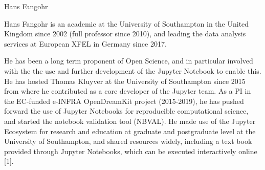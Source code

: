 \begin{participant}[type=leadPI,PM=4,gender=male]{Hans Fangohr}








  \medskip Hans Fangohr is an academic at the University
  of Southampton in the United Kingdom since 2002 (full professor
  since 2010), and leading the data analysis services at European XFEL
  in Germany since 2017.

  He has been a long term proponent of Open Science, and in particular
  involved with the the use and further development of the Jupyter
  Notebook to enable this. He has hosted Thomas Kluyver at the
  University of Southampton since 2015 from where he contributed as a
  core developer of the Jupyter team. As a PI in the EC-funded e-INFRA
  OpenDreamKit project (2015-2019), he has pushed forward the use of
  Jupyter Notebooks for reproducible computational science, and
  started the notebook validation tool (NBVAL). He made use of the
  Jupyter Ecosystem for research and education at graduate and
  postgraduate level at the University of Southampton, and shared
  resources widely, including a text book provided through Jupyter
  Notebooks, which can be executed interactively online [1].


\end{participant}

